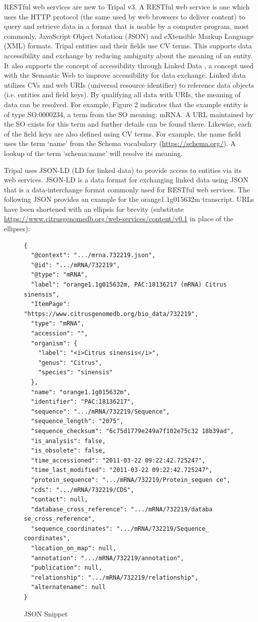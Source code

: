RESTful web services are new to Tripal v3. A RESTful web service is one which uses the HTTP protocol (the same used by web browsers to deliver content) to query and retrieve data in a format that is usable by a computer program, most commonly, JavaScript Object Notation (JSON) and eXtensible Markup Language (XML) formats. Tripal entities and their fields use CV terms. This supports data accessibility and exchange by reducing ambiguity about the meaning of an entity. It also supports the concept of accessibility through Linked Data \cite{heath2011linked,bizer2011linked}, a concept used with the Semantic Web \cite{Berners_Lee_2001} to improve accessibility for data exchange. Linked data utilizes CVs and web URIs (universal resource identifier) to reference data objects (i.e. entities and field keys). By qualifying all data with URIs, the meaning of data can be resolved. For example, Figure 2 indicates that the example entity is of type SO:0000234, a term from the SO meaning: mRNA. A URL maintained by the SO exists for this term and further details can be found there. Likewise, each of the field keys are also defined using CV terms. For example, the name field uses the term ‘name’ from the Schema vocabulary (\url{https://schema.org/}). A lookup of the term ‘schema:name’ will resolve its meaning.

Tripal uses JSON-LD \cite{W3C_2014} (LD for linked data) to provide access to entities via its web services. JSON-LD is a data format for exchanging linked data using JSON that is a data-interchange format commonly used for RESTful web services. The following JSON provides an example for the orange1.1g015632m transcript. URLs have been shortened with an ellipsis for brevity (substitute \url{https://www.citrusgenomedb.org/web-services/content/v0.1} in place of the ellipses):


\begin{figure}[!ht]
\centering
\begin{lstlisting}
{
  "@context": ".../mrna.732219.json",
  "@id": ".../mRNA/732219",
  "@type": "mRNA",
  "label": "orange1.1g015632m, PAC:18136217 (mRNA) Citrus sinensis",
  "ItemPage": "https://www.citrusgenomedb.org/bio_data/732219",
  "type": "mRNA",
  "accession": "",
  "organism": {
    "label": "<i>Citrus sinensis</i>",
    "genus": "Citrus",
    "species": "sinensis"
  },
  "name": "orange1.1g015632m",
  "identifier": "PAC:18136217",
  "sequence": ".../mRNA/732219/Sequence",
  "sequence_length": "2075",
  "sequence_checksum": "6c75d1779e249a7f102e75c32 18b39ad",
  "is_analysis": false,
  "is_obsolete": false,
  "time_accessioned": "2011-03-22 09:22:42.725247",
  "time_last_modified": "2011-03-22 09:22:42.725247",
  "protein_sequence": ".../mRNA/732219/Protein_sequen ce",
  "cds": ".../mRNA/732219/CDS",
  "contact": null,
  "database_cross_reference": ".../mRNA/732219/databa se_cross_reference",
  "sequence_coordinates": ".../mRNA/732219/Sequence_ coordinates",
  "location_on_map": null,
  "annotation": ".../mRNA/732219/annotation",
  "publication": null,
  "relationship": ".../mRNA/732219/relationship",
  "alternatename": null
}
\end{lstlisting}
\caption{JSON Snippet}
\end{figure}

